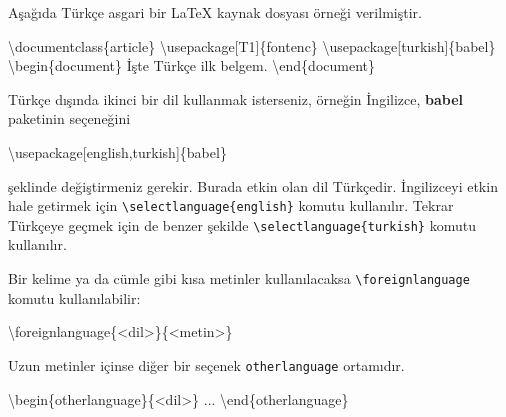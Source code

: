 \documentclass[
  letterpaper,
  DIV=11,
  numbers=noendperiod]{scrreprt}
\newenvironment{Shaded}{\begin{snugshade}}{\end{snugshade}}
\newcommand{\BuiltInTok}[1]{\textcolor[rgb]{0.00,0.23,0.31}{#1}}
\newcommand{\ExtensionTok}[1]{\textcolor[rgb]{0.00,0.23,0.31}{#1}}
\newcommand{\FunctionTok}[1]{\textcolor[rgb]{0.28,0.35,0.67}{#1}}
\newcommand{\KeywordTok}[1]{\textcolor[rgb]{0.00,0.23,0.31}{#1}}
\newcommand{\NormalTok}[1]{\textcolor[rgb]{0.00,0.23,0.31}{#1}}
\begin{document}
Aşağıda Türkçe asgari bir {\LaTeX} kaynak dosyası örneği verilmiştir.

\begin{Shaded}
\begin{Highlighting}[]
\BuiltInTok{\textbackslash{}documentclass}\NormalTok{\{}\ExtensionTok{article}\NormalTok{\}}
\BuiltInTok{\textbackslash{}usepackage}\NormalTok{[T1]\{}\ExtensionTok{fontenc}\NormalTok{\}}
\BuiltInTok{\textbackslash{}usepackage}\NormalTok{[turkish]\{}\ExtensionTok{babel}\NormalTok{\}}
\KeywordTok{\textbackslash{}begin}\NormalTok{\{}\ExtensionTok{document}\NormalTok{\}}
\NormalTok{  İşte  Türkçe ilk belgem.}
\KeywordTok{\textbackslash{}end}\NormalTok{\{}\ExtensionTok{document}\NormalTok{\}}
\end{Highlighting}
\end{Shaded}

Türkçe dışında ikinci bir dil kullanmak isterseniz, örneğin İngilizce,
\textbf{babel} paketinin seçeneğini

\begin{Shaded}
\begin{Highlighting}[]
\BuiltInTok{\textbackslash{}usepackage}\NormalTok{[english,turkish]\{}\ExtensionTok{babel}\NormalTok{\}}
\end{Highlighting}
\end{Shaded}

şeklinde değiştirmeniz gerekir. Burada etkin olan dil Türkçedir.
İngilizceyi etkin hale getirmek için
\texttt{\textbackslash{}selectlanguage\{english\}} komutu kullanılır.
Tekrar Türkçeye geçmek için de benzer şekilde
\texttt{\textbackslash{}selectlanguage\{turkish\}} komutu kullanılır.

Bir kelime ya da cümle gibi kısa metinler kullanılacaksa
\texttt{\textbackslash{}foreignlanguage} komutu kullanılabilir:

\begin{Shaded}
\begin{Highlighting}[]
\FunctionTok{\textbackslash{}foreignlanguage}\NormalTok{\{\textless{}dil\textgreater{}\}\{\textless{}metin\textgreater{}\}}
\end{Highlighting}
\end{Shaded}

Uzun metinler içinse diğer bir seçenek \texttt{otherlanguage} ortamıdır.

\begin{Shaded}
\begin{Highlighting}[]
\KeywordTok{\textbackslash{}begin}\NormalTok{\{}\ExtensionTok{otherlanguage}\NormalTok{\}\{\textless{}dil\textgreater{}\}}
\NormalTok{  ...}
\KeywordTok{\textbackslash{}end}\NormalTok{\{}\ExtensionTok{otherlanguage}\NormalTok{\}}
\end{Highlighting}
\end{Shaded}
\end{document}
